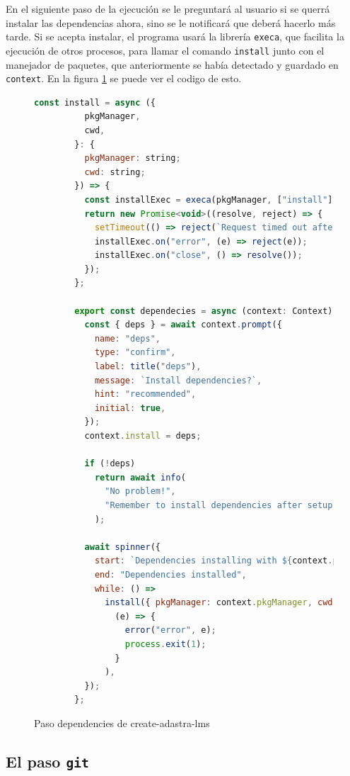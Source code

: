 En el siguiente paso de la ejecución se le preguntará al usuario si se querrá instalar las dependencias ahora, sino se le notificará que deberá hacerlo más tarde. Si se acepta instalar, el programa usará la librería \verb|execa|\cite{execa}, que facilita la ejecución de otros procesos, para llamar el comando \verb|install| junto con el manejador de paquetes, que anteriormente se había detectado y guardado en \verb|context|. En la figura \ref{fig:adastraCreateDependencies} se puede ver el codigo de esto.

\begin{figure}
    \begin{lstlisting}[language=Javascript]
        const install = async ({
          pkgManager,
          cwd,
        }: {
          pkgManager: string;
          cwd: string;
        }) => {
          const installExec = execa(pkgManager, ["install"], { cwd });
          return new Promise<void>((resolve, reject) => {
            setTimeout(() => reject(`Request timed out after one minute`), 300_000);
            installExec.on("error", (e) => reject(e));
            installExec.on("close", () => resolve());
          });
        };
        
        export const dependecies = async (context: Context) => {
          const { deps } = await context.prompt({
            name: "deps",
            type: "confirm",
            label: title("deps"),
            message: `Install dependencies?`,
            hint: "recommended",
            initial: true,
          });
          context.install = deps;
        
          if (!deps)
            return await info(
              "No problem!",
              "Remember to install dependencies after setup."
            );
        
          await spinner({
            start: `Dependencies installing with ${context.pkgManager}...`,
            end: "Dependencies installed",
            while: () =>
              install({ pkgManager: context.pkgManager, cwd: context.cwd }).catch(
                (e) => {
                  error("error", e);
                  process.exit(1);
                }
              ),
          });
        };
    \end{lstlisting}
    \caption{Paso dependencies de create-adastra-lms}
    \label{fig:adastraCreateDependencies}
\end{figure}

\subsection{El paso {\tt git}}

